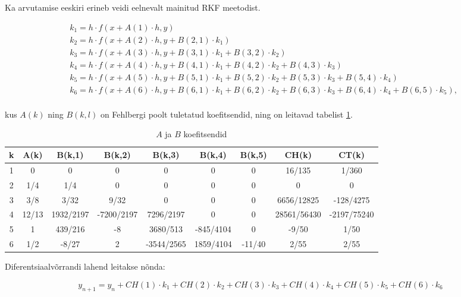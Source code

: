 \begin{flushleft}
Ka arvutamise eeskiri erineb veidi eelnevalt mainitud RKF meetodist.

\begin{equation}
\begin{split}
&k_{1}=h \cdot f(x+A(1) \cdot h, y) \\
&k_{2}=h \cdot f(x+A(2)\cdot h, y+B(2,1) \cdot k_{1})\\
&k_{3}=h \cdot f(x+A(3)\cdot h, y+B(3,1)\cdot k_{1} + B(3,2) \cdot k_{2})\\
&k_{4}=h \cdot f(x+A(4)\cdot h, y+B(4,1)\cdot k_{1} + B(4,2) \cdot k_{2} + B(4,3)\cdot k_{3})\\
&k_{5}=h \cdot f(x+A(5)\cdot h, y+B(5,1)\cdot k_{1} + B(5,2) \cdot k_{2} + B(5,3)\cdot k_{3} + B(5,4)\cdot k_{4})\\
&k_{6}=h \cdot f(x+A(6)\cdot h, y+B(6,1)\cdot k_{1} + B(6,2) \cdot k_{2} + B(6,3)\cdot k_{3} + B(6,4)\cdot k_{4}+B(6,5)\cdot k_{5}),\\
\end{split}
\label{RKF45_K}
\end{equation}

kus $A(k)$ ning $B(k,l)$ on Fehlbergi poolt tuletatud koefitsendid, ning on leitavad tabelist \ref{table_1}.


\begin{table}[h]
\centering
\begin{tabular}{|c|c|c|c|c|c|c|c|c|}
\hline
k&A(k)&B(k,1)&B(k,2)&B(k,3)&B(k,4)&B(k,5)&CH(k)&CT(k)\\
\hline
1&0&0&0&0&0&0&16/135&1/360\\
\hline
2&1/4&1/4&0&0&0&0&0&0\\
\hline
3&3/8&3/32 & 9/32 & 0 & 0 & 0& 6656/12825 & -128/4275 \\
\hline
4&12/13&1932/2197 & -7200/2197 & 7296/2197 & 0 & 0 & 28561/56430 & -2197/75240\\
\hline
5&1&439/216 & -8 & 3680/513 & -845/4104 & 0& -9/50&1/50\\
\hline
6&1/2&-8/27 & 2 & -3544/2565 & 1859/4104 & -11/40& 2/55 & 2/55 \\
\hline
\end{tabular}
\caption{ $A$ ja $B$ koefitsendid}
\label{table_1}
\end{table}

Diferentsiaalvõrrandi lahend leitakse nõnda:

\begin{equation}
y_{n+1}=y_{n}+CH(1)\cdot k_{1}+CH(2)\cdot k_{2}+CH(3)\cdot k_{3}+CH(4)\cdot k_{4}+CH(5)\cdot k_{5}+CH(6)\cdot k_{6}
\end{equation}


\end{flushleft}

